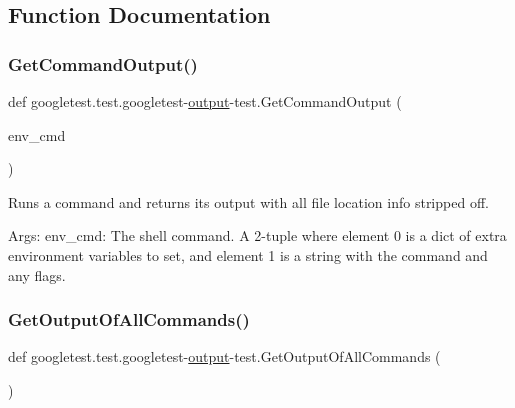 \subsection{Function Documentation}
\mbox{\label{namespacegoogletest_1_1test_1_1googletest-output-test_a57e27de68d1c4a6ae2fea7321123060b}} 
\subsubsection{\texorpdfstring{GetCommandOutput()}{GetCommandOutput()}}
{\footnotesize\ttfamily def googletest.\+test.\+googletest-\/\mbox{\hyperlink{namespacegoogletest_1_1test_1_1googletest-output-test_a6773c2217ae4694b4db5610620562437}{output}}-\/test.\+Get\+Command\+Output (\begin{DoxyParamCaption}\item[{}]{env\+\_\+cmd }\end{DoxyParamCaption})}

\begin{DoxyVerb}Runs a command and returns its output with all file location
info stripped off.

Args:
  env_cmd:  The shell command. A 2-tuple where element 0 is a dict of extra
            environment variables to set, and element 1 is a string with
            the command and any flags.
\end{DoxyVerb}
 \mbox{\label{namespacegoogletest_1_1test_1_1googletest-output-test_a7baabb9ec5690eff9a0985fb468c21da}} 
\subsubsection{\texorpdfstring{GetOutputOfAllCommands()}{GetOutputOfAllCommands()}}
{\footnotesize\ttfamily def googletest.\+test.\+googletest-\/\mbox{\hyperlink{namespacegoogletest_1_1test_1_1googletest-output-test_a6773c2217ae4694b4db5610620562437}{output}}-\/test.\+Get\+Output\+Of\+All\+Commands (\begin{DoxyParamCaption}{ }\end{DoxyParamCaption})}

